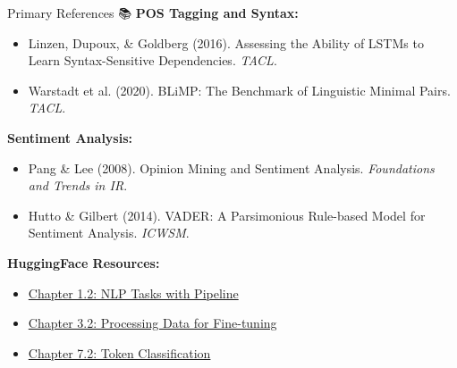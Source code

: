 \documentclass[aspectratio=169]{beamer}
\begin{document}
\begin{frame}[shrink=10]{Primary References 📚}
    \textbf{POS Tagging and Syntax:}
    \begin{itemize}\setlength{\itemsep}{0pt}
        \item Linzen, Dupoux, \& Goldberg (2016). Assessing the Ability of LSTMs to Learn Syntax-Sensitive Dependencies. \textit{TACL}.
        \item Warstadt et al. (2020). BLiMP: The Benchmark of Linguistic Minimal Pairs. \textit{TACL}.
    \end{itemize}

    \vspace{0.3em}
    \textbf{Sentiment Analysis:}
    \begin{itemize}\setlength{\itemsep}{0pt}
        \item Pang \& Lee (2008). Opinion Mining and Sentiment Analysis. \textit{Foundations and Trends in IR}.
        \item Hutto \& Gilbert (2014). VADER: A Parsimonious Rule-based Model for Sentiment Analysis. \textit{ICWSM}.
    \end{itemize}

    \vspace{0.3em}
    \textbf{HuggingFace Resources:}
    \begin{itemize}\setlength{\itemsep}{0pt}
        \item \href{https://huggingface.co/learn/nlp-course/chapter1/2}{Chapter 1.2: NLP Tasks with Pipeline}
        \item \href{https://huggingface.co/learn/nlp-course/chapter3/2}{Chapter 3.2: Processing Data for Fine-tuning}
        \item \href{https://huggingface.co/learn/nlp-course/chapter7/2}{Chapter 7.2: Token Classification}
    \end{itemize}
\end{frame}
\end{document}
